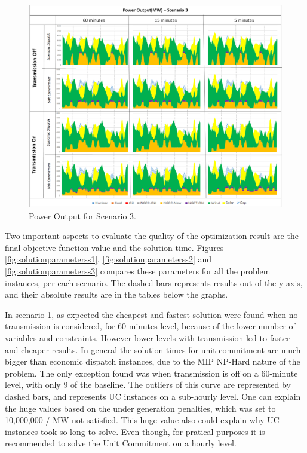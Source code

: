 \documentclass[12pt,LUDisStyle,twosided]{book}
\begin{document}
\begin{figure} 
  \centering
  
	  \includegraphics[width=\textwidth,height=\textheight,keepaspectratio]{PowerOutputScenario3.png}
  
  \caption{Power Output for Scenario 3.}
  \label{fig:powerOutputScenario3}
\end{figure}


Two important aspects to evaluate the quality of the optimization result are the final objective function value and the solution time. Figures \ref{fig:solutionparameterss1}, \ref{fig:solutionparameterss2} and \ref{fig:solutionparameterss3} compares these parameters for all the problem instances, per each scenario. The dashed bars represents results out of the y-axis, and their absolute results are in the tables below the graphs. 

In scenario 1, as expected the cheapest and fastest solution were found when no transmission is considered, for 60 minutes level, because of the lower number of variables and constraints. However lower levels with transmission led to faster and cheaper results. In general the solution times for unit commitment are much bigger than economic dispatch instances, due to the MIP NP-Hard nature of the problem. The only exception found was when transmission is off on a 60-minute level, with only 9 of the baseline. The outliers of this curve are represented by dashed bars, and represents UC instances on a sub-hourly level. One can explain the huge values based on the under generation penalties, which was set to 10,000,000 / MW not satisfied. This huge value also could explain why UC instances took so long to solve. Even though, for pratical purposes it is recommended to solve the Unit Commitment on a hourly level.
\end{document}
